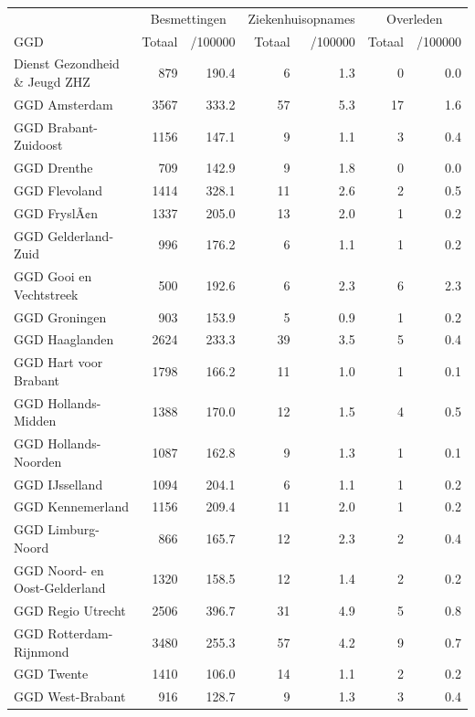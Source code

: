 \documentclass[
  english,
  man,floatsintext]{apa6}
\begin{document}
\begin{table}
\centering\begingroup\fontsize{10}{12}\selectfont

\begin{threeparttable}
\begin{tabular}{lrrrrrr}
\toprule
\multicolumn{1}{c}{ } & \multicolumn{2}{c}{Besmettingen} & \multicolumn{2}{c}{Ziekenhuisopnames} & \multicolumn{2}{c}{Overleden} \\
\cmidrule(l{3pt}r{3pt}){2-3} \cmidrule(l{3pt}r{3pt}){4-5} \cmidrule(l{3pt}r{3pt}){6-7}
GGD & Totaal & /100000 & Totaal & /100000 & Totaal & /100000\\
\midrule
Dienst Gezondheid \& Jeugd ZHZ & 879 & 190.4 & 6 & 1.3 & 0 & 0.0\\
GGD Amsterdam & 3567 & 333.2 & 57 & 5.3 & 17 & 1.6\\
GGD Brabant-Zuidoost & 1156 & 147.1 & 9 & 1.1 & 3 & 0.4\\
GGD Drenthe & 709 & 142.9 & 9 & 1.8 & 0 & 0.0\\
GGD Flevoland & 1414 & 328.1 & 11 & 2.6 & 2 & 0.5\\
GGD FryslÃ¢n & 1337 & 205.0 & 13 & 2.0 & 1 & 0.2\\
GGD Gelderland-Zuid & 996 & 176.2 & 6 & 1.1 & 1 & 0.2\\
GGD Gooi en Vechtstreek & 500 & 192.6 & 6 & 2.3 & 6 & 2.3\\
GGD Groningen & 903 & 153.9 & 5 & 0.9 & 1 & 0.2\\
GGD Haaglanden & 2624 & 233.3 & 39 & 3.5 & 5 & 0.4\\
GGD Hart voor Brabant & 1798 & 166.2 & 11 & 1.0 & 1 & 0.1\\
GGD Hollands-Midden & 1388 & 170.0 & 12 & 1.5 & 4 & 0.5\\
GGD Hollands-Noorden & 1087 & 162.8 & 9 & 1.3 & 1 & 0.1\\
GGD IJsselland & 1094 & 204.1 & 6 & 1.1 & 1 & 0.2\\
GGD Kennemerland & 1156 & 209.4 & 11 & 2.0 & 1 & 0.2\\
GGD Limburg-Noord & 866 & 165.7 & 12 & 2.3 & 2 & 0.4\\
GGD Noord- en Oost-Gelderland & 1320 & 158.5 & 12 & 1.4 & 2 & 0.2\\
GGD Regio Utrecht & 2506 & 396.7 & 31 & 4.9 & 5 & 0.8\\
GGD Rotterdam-Rijnmond & 3480 & 255.3 & 57 & 4.2 & 9 & 0.7\\
GGD Twente & 1410 & 106.0 & 14 & 1.1 & 2 & 0.2\\
GGD West-Brabant & 916 & 128.7 & 9 & 1.3 & 3 & 0.4\\

\end{tabular}
\end{threeparttable}
\end{table}
\end{document}
